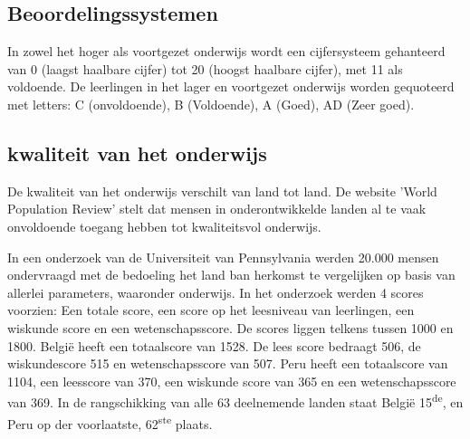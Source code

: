 

\subsection{Beoordelingssystemen}
In zowel het hoger als voortgezet onderwijs wordt een cijfersysteem gehanteerd van 0 (laagst haalbare cijfer) tot 20 (hoogst haalbare cijfer), met 11 als voldoende. De leerlingen in het lager en voortgezet onderwijs worden gequoteerd met letters: C (onvoldoende), B (Voldoende), A (Goed), AD (Zeer goed). \autocite{Nuffic2015}

\subsection{kwaliteit van het onderwijs}
De kwaliteit van het onderwijs verschilt van land tot land. \autocite{Review2020} De website 'World Population Review' stelt dat mensen in onderontwikkelde landen al te vaak onvoldoende toegang hebben tot kwaliteitsvol onderwijs. 

In een onderzoek van de Universiteit van Pennsylvania \autocite{UsNews2020} werden 20.000 mensen ondervraagd met de bedoeling het land ban herkomst te vergelijken op basis van allerlei parameters, waaronder onderwijs. In het onderzoek werden 4 scores voorzien: Een totale score, een score op het leesniveau van leerlingen, een wiskunde score en een wetenschapsscore. De scores liggen telkens tussen 1000 en 1800. België heeft een totaalscore van 1528. De lees score bedraagt 506, de wiskundescore 515 en wetenschapsscore van 507. Peru heeft een totaalscore van 1104, een leesscore van 370, een wiskunde score van 365 en een wetenschapsscore van 369. In de rangschikking van alle 63 deelnemende landen staat België 15\textsuperscript{de}, en Peru op der voorlaatste, 62\textsuperscript{ste} plaats.



